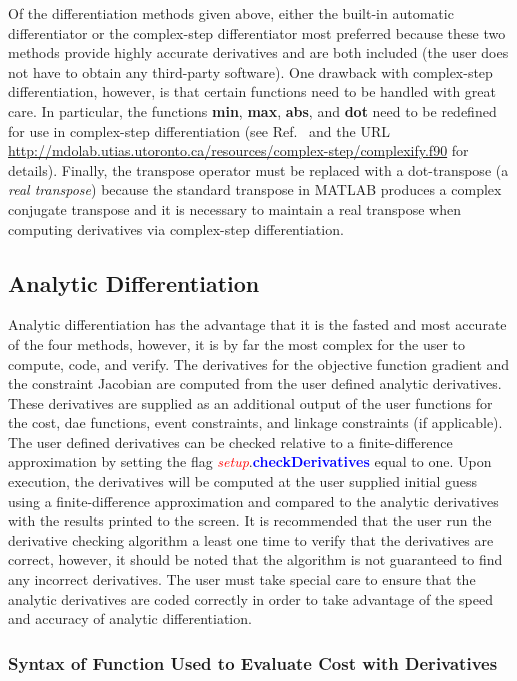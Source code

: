 \documentclass[10pt,final]{report}
\newcommand{\bfblue}[1]{\textcolor{blue}{\bf #1}}
\newcommand{\slred}[1]{\textcolor{red}{\sl #1}}
\begin{document}
Of the differentiation methods given above, either the built-in automatic
differentiator or the complex-step differentiator most preferred
because these two methods provide highly accurate derivatives and are
both included (\ie the user
does not have to obtain any third-party software). One drawback with
complex-step differentiation, however, is that certain functions need
to be handled with great care.  In particular, the functions {\bf
  min}, {\bf max}, {\bf abs}, and {\bf dot} need to be redefined for
use in complex-step differentiation (see Ref.~ and the URL
\url{http://mdolab.utias.utoronto.ca/resources/complex-step/complexify.f90}
for details).  Finally, the transpose operator must be replaced with a
dot-transpose (\ie a {\em real transpose}) because the standard
transpose in MATLAB produces a complex conjugate transpose and it is
necessary to maintain a real transpose when computing derivatives via
complex-step differentiation.

\subsection{Analytic Differentiation}
Analytic differentiation has the advantage that it is the fasted and most accurate of the four methods, however, it is by far the most complex for the user to compute, code, and verify.  The derivatives for the objective function gradient and the constraint Jacobian are computed from the user defined analytic derivatives.  These derivatives are supplied as an additional output of the user functions for the cost, dae functions, event constraints, and linkage constraints (if applicable).
The user defined derivatives can be checked relative to a finite-difference approximation by setting the flag \slred{setup}.\bfblue{checkDerivatives} equal to one. Upon execution, the derivatives will be computed at the user supplied initial guess using a finite-difference approximation and compared to the analytic derivatives with the results printed to the screen.  It is recommended that the user run the derivative checking algorithm a least one time to verify that the derivatives are correct, however, it should be noted that the algorithm is not guaranteed to find any incorrect derivatives.  The user must take special care to ensure that the analytic derivatives are coded correctly in order to take advantage of the speed and accuracy of analytic differentiation.

\subsubsection{Syntax of Function Used to Evaluate Cost with Derivatives}
\end{document}
